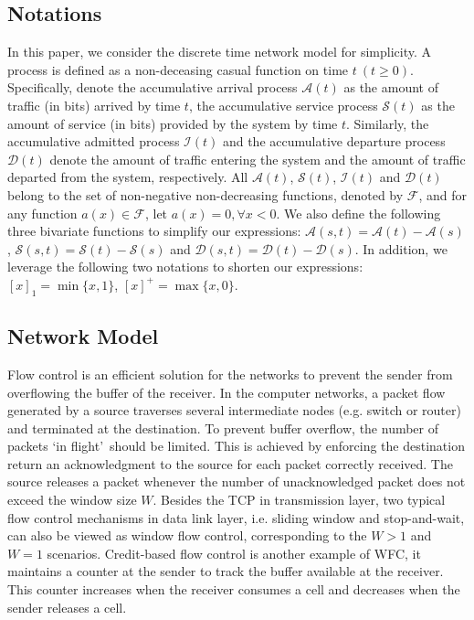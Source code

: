 \documentclass[paper]{ieice}
\begin{document}
\subsection{Notations}\label{notation}
In this paper, we consider the discrete time network model for simplicity. A process is defined as a non-deceasing casual function on time $t\ (t\geq 0)$. Specifically, denote the accumulative arrival process $\mathcal{A}(t)$ as the amount of traffic (in bits) arrived by time $t$, the accumulative service process $\mathcal{S}(t)$ as the amount of service (in bits) provided by the system by time $t$. Similarly, the accumulative admitted process $\mathcal{I}(t)$ and the accumulative departure process $\mathcal{D}(t)$ denote the amount of traffic entering the system and the amount of traffic departed from the system, respectively. All $\mathcal{A}(t)$, $\mathcal{S}(t)$, $\mathcal{I}(t)$ and $\mathcal{D}(t)$ belong to the set of non-negative non-decreasing functions, denoted by $\mathcal{F}$, and for any function $a(x)\in\mathcal{F}$, let $a(x)=0,\forall x<0$. We also define the following three bivariate functions to simplify our expressions: $\mathcal{A}(s,t)=\mathcal{A}(t)-\mathcal{A}(s)$, $\mathcal{S}(s,t)=\mathcal{S}(t)-\mathcal{S}(s)$ and $\mathcal{D}(s,t)=\mathcal{D}(t)-\mathcal{D}(s)$. In addition, we leverage the following two notations to shorten our expressions: $[x]_1=\min\{x,1\}$, $[x]^+=\max\{x,0\}$.

\subsection{Network Model}\label{model}
Flow control is an efficient solution for the networks to prevent the sender from overflowing the buffer of the receiver. In the computer networks, a packet flow generated by a source traverses several intermediate nodes (e.g. switch or router) and terminated at the destination. To prevent buffer overflow, the number of packets \textquoteleft in flight\textquoteright\ should be limited. This is achieved by enforcing the destination return an acknowledgment to the source for each packet correctly received. The source releases a packet whenever the number of unacknowledged packet does not exceed the window size $W$. Besides the TCP \cite{RFC5681} in transmission layer, two typical flow control mechanisms in data link layer, i.e. sliding window and stop-and-wait, can also be viewed as window flow control, corresponding to the $W>1$ and $W=1$ scenarios. Credit-based flow control is another example of WFC, it maintains a counter at the sender to track the buffer available at the receiver. This counter increases when the receiver consumes a cell and decreases when the sender releases a cell.
\end{document}
